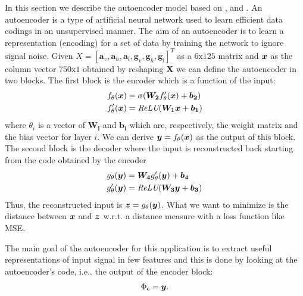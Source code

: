 In this section we describe the autoencoder model based on
\cite{vincent2010stacked}, \cite{gu2018locomotion} and
\cite{gao2019human}. An autoencoder is a type of artificial neural
network used to learn efficient data codings in an unsupervised
manner. The aim of an autoencoder is to learn a representation
(encoding) for a set of data by training the network to ignore signal
noise. Given $X = [ \boldsymbol{a}_v, \boldsymbol{a}_h,
  \boldsymbol{a}_l, \boldsymbol{g}_v, \boldsymbol{g}_h,
  \boldsymbol{g}_l ]^T$ as a $6\text{x}125$ matrix and $\boldsymbol{x}$ as the
column vector $750\text{x}1$ obtained by reshaping $\boldsymbol{X}$ we
can define the autoencoder in two blocks. The first block is the
encoder which is a function of the input:
\begin{align}
  f_{\theta}(\boldsymbol{x}) &= \sigma(\boldsymbol{W_{2}} f'_\theta(\boldsymbol{x}) + \boldsymbol{b_{2}}) \\
  f'_{\theta}(\boldsymbol{x}) &= \textit{ReLU}(\boldsymbol{W_{1}}\boldsymbol{x} + \boldsymbol{b_{1}})
\end{align}
where $\theta_{i}$ is a vector of $\boldsymbol{W_{i}}$ and $\boldsymbol{b_{i}}$
which are, respectively, the weight matrix and the bias
vector for layer $i$. We
can derive $\boldsymbol{y} = f_\theta(\boldsymbol{x})$ as the output of this
block. The second block is the decoder where the input is
reconstructed back starting from the code obtained by the encoder
\begin{align}
  g_{\theta}(\boldsymbol{y}) &= \boldsymbol{W_{4}} g'_\theta(\boldsymbol{y}) + \boldsymbol{b_{4}} \\
  g'_{\theta}(\boldsymbol{y}) &= \textit{ReLU}(\boldsymbol{W_{3}}\boldsymbol{y} + \boldsymbol{b_{3}})
\end{align}
Thus, the reconstructed input
is $\boldsymbol{z} = g_{\theta}(\boldsymbol{y})$. What we want to minimize is the distance
between $\boldsymbol{x}$ and $\boldsymbol{z}$ w.r.t. a distance measure with a loss function
like MSE.

The main goal of the autoencoder for this application is to extract
useful representations of input signal in few features and this is
done by looking at the autoencoder's code, i.e., the output of the
encoder block:
\begin{equation}
  \Phi_{\text{e}} = \boldsymbol{y}.
\end{equation}

